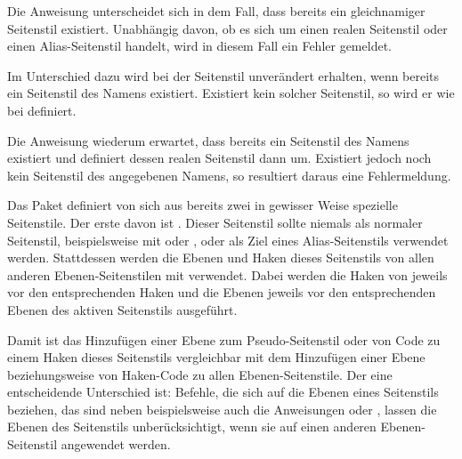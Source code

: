 Die Anweisung  unterscheidet sich in dem
Fall, dass bereits ein gleichnamiger Seitenstil existiert. Unabhängig davon,
ob es sich um einen realen Seitenstil oder einen Alias-Seitenstil handelt,
wird in diesem Fall ein Fehler gemeldet.%
\fi

Im Unterschied dazu wird bei  der Seitenstil
unverändert erhalten, wenn bereits ein Seitenstil des Namens
 existiert. Existiert kein solcher Seitenstil, so wird
er wie bei  definiert.

Die Anweisung  wiederum erwartet, dass
bereits ein Seitenstil des Namens  existiert und
definiert dessen realen Seitenstil dann um. Existiert jedoch noch kein
Seitenstil des angegebenen Namens, so resultiert daraus eine Fehlermeldung.%
%
\EndIndexGroup


\begin{Declaration}
\end{Declaration}
%
%
Das Paket  definiert von sich aus bereits zwei in gewisser
Weise spezielle Seitenstile. Der erste davon ist
. Dieser
Seitenstil sollte niemals als normaler Seitenstil, beispielsweise mit
 oder , oder
als Ziel eines Alias-Seitenstils verwendet werden. Stattdessen werden die
Ebenen und Haken dieses Seitenstils von allen anderen
Ebenen-Seitenstilen mit verwendet. Dabei werden die Haken von
 jeweils vor den entsprechenden Haken und die Ebenen
jeweils vor den entsprechenden Ebenen des aktiven Seitenstils ausgeführt.

Damit ist das Hinzufügen einer Ebene zum Pseudo-Seitenstil
 oder von Code zu einem Haken dieses Seitenstils
vergleichbar mit dem Hinzufügen einer Ebene beziehungsweise von Haken-Code zu
allen Ebenen-Seitenstile. Der eine entscheidende Unterschied ist: Befehle, die
sich auf die Ebenen eines Seitenstils beziehen, das sind neben
 beispielsweise auch die
Anweisungen  oder
, lassen die Ebenen des
Seitenstils  unberücksichtigt, wenn sie auf einen
anderen Ebenen-Seitenstil angewendet werden.

